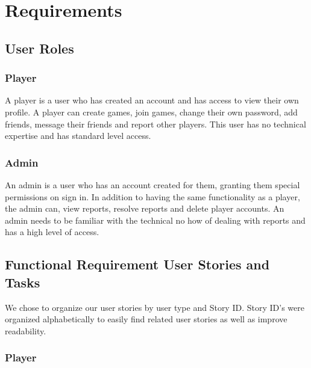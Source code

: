 \section{Requirements}

\subsection{User Roles}


\subsubsection{Player}
A player is a user who has created an account and has access to view their own profile. A player can create games, join games, change their own password, add friends, message their friends and report other players. This user has no technical expertise and has standard level access.

\subsubsection{Admin}
An admin is a user who has an account created for them, granting them special permissions on sign in. In addition to having the same functionality as a player, the admin can, view reports, resolve reports and delete player accounts. An admin needs to be familiar with the technical no how of dealing with reports and has a high level of access.



\subsection{Functional Requirement User Stories and Tasks}

We chose to organize our user stories by user type and Story ID. Story ID's were organized alphabetically to easily find related user stories as well as improve readability.


\subsubsection{Player}

